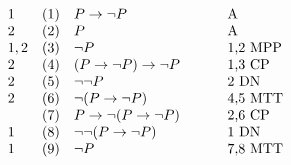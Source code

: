 \documentclass{standalone}
\begin{document}
$ \begin{array}{l l >{$}p{3.5cm}<{$} p{1.5cm}}

     1 & (1) & P\to\neg P & A \\
     2 & (2) & P & A \\
     1,2 & (3) & \neg P & 1,2 MPP \\
     2 & (4) & (P\to \neg P)\to \neg P & 1,3 CP \\
     2 & (5) & \neg\neg P & 2 DN \\
     2 & (6) & \neg (P\to \neg P) & 4,5 MTT \\
       & (7) & P\to \neg (P\to \neg P) & 2,6 CP \\
     1 & (8) & \neg\neg (P\to \neg P) & 1 DN \\
     1 & (9) & \neg P & 7,8 MTT    \end{array} $
\end{document}
